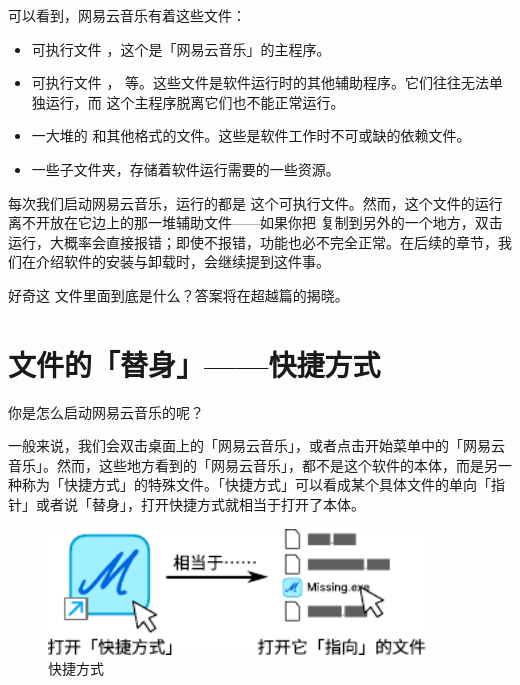 {{可以看到，网易云音乐有着这些文件：

\begin{itemize}
  \item 可执行文件  ，这个是「网易云音乐」的主程序。
  \item 可执行文件 ， 等。这些文件是软件运行时的其他辅助程序。它们往往无法单独运行，而  这个主程序脱离它们也不能正常运行。
  \item 一大堆的  和其他格式的文件。这些是软件工作时不可或缺的依赖文件。
  \item 一些子文件夹，存储着软件运行需要的一些资源。
\end{itemize}

每次我们启动网易云音乐，运行的都是  这个可执行文件。然而，这个文件的运行离不开放在它边上的那一堆辅助文件——如果你把  复制到另外的一个地方，双击运行，大概率会直接报错；即使不报错，功能也必不完全正常。在后续的章节，我们在介绍软件的安装与卸载时，会继续提到这件事。

\begin{note}
  好奇这  文件里面到底是什么？答案将在超越篇的揭晓。
\end{note}

\section{文件的「替身」——快捷方式}

你是怎么启动网易云音乐的呢？

一般来说，我们会双击桌面上的「网易云音乐」，或者点击开始菜单中的「网易云音乐」。然而，这些地方看到的「网易云音乐」，都不是这个软件的本体，而是另一种称为「快捷方式」的特殊文件。「快捷方式」可以看成某个具体文件的单向「指针」或者说「替身」，打开快捷方式就相当于打开了本体。

\begin{figure}[htb!]
  \centering
  \includegraphics[width=10cm]{assets/basic/Link.pdf}
  \caption{快捷方式}
  \label{fig:Link}
\end{figure}

}}
